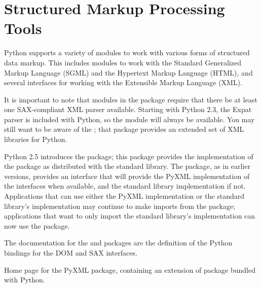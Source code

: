 \chapter{Structured Markup Processing Tools
         \label{markup}}

Python supports a variety of modules to work with various forms of
structured data markup.  This includes modules to work with the
Standard Generalized Markup Language (SGML) and the Hypertext Markup
Language (HTML), and several interfaces for working with the
Extensible Markup Language (XML).

It is important to note that modules in the  package
require that there be at least one SAX-compliant XML parser available.
Starting with Python 2.3, the Expat parser is included with Python, so
the  module will always be available.
You may still want to be aware of the ; that package provides an
extended set of XML libraries for Python.

Python 2.5 introduces the  package; this package
provides the implementation of the  package as distributed
with the standard library.  The  package, as in earlier
versions, provides an interface that will provide the PyXML
implementation of the interfaces when available, and the standard
library implementation if not.  Applications that can use either the
PyXML implementation or the standard library's implementation may
continue to make imports from the  package; applications
that want to only import the standard library's implementation can now
use the  package.

The documentation for the  and 
packages are the definition of the Python bindings for the DOM and SAX
interfaces.

\localmoduletable

\begin{seealso}
           {Home page for the PyXML package, containing an extension
            of  package bundled with Python.}
\end{seealso}
